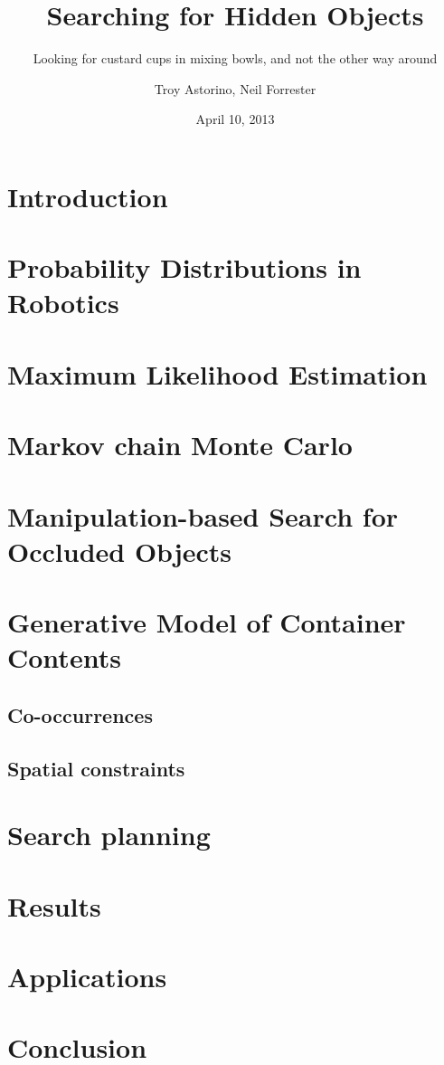 \documentclass{beamer}
\title{Searching for Hidden Objects}
\subtitle{Looking for custard cups in mixing bowls, and not the other way around}
\author{Troy Astorino, Neil Forrester}
\date{April 10, 2013}
\institute[6.834 -- MIT]{Cognitive Robotics \\ Massachusetts Institute of Technology}
\begin{document}
\section{Introduction}


\section{Probability Distributions in Robotics}


\section{Maximum Likelihood Estimation}


\section{Markov chain Monte Carlo}


\section{Manipulation-based Search for Occluded Objects}


\section{Generative Model of Container Contents}
\subsection{Co-occurrences}






\subsection{Spatial constraints}


\section{Search planning}


\section{Results}


\section{Applications}


\section{Conclusion}

\end{document}
